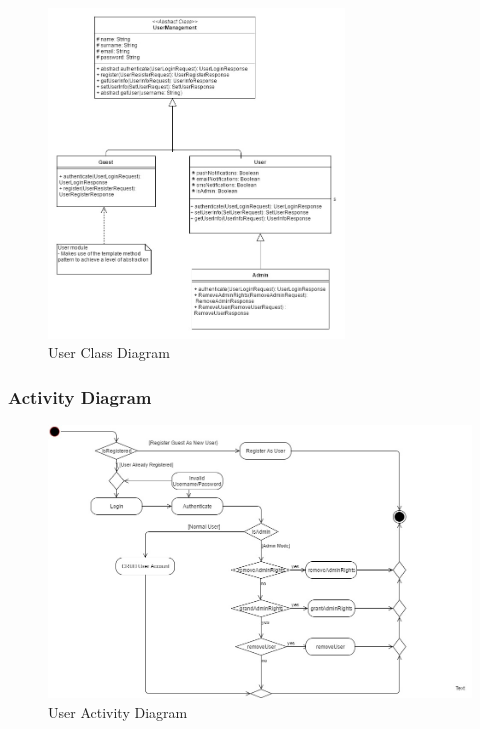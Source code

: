 \begin{figure}[H]
	\centering
	\includegraphics[width=0.7\textwidth]{user/img/UserClassDiagram.jpg}
	\caption{User Class Diagram}
\end{figure}



%
%
%
\subsubsection{Activity Diagram}

\begin{figure}[H]
		\centering
		\includegraphics[width=\textwidth]{user/img/UserActivityDiagram.jpg}
		\caption{User Activity Diagram}
\end{figure}


